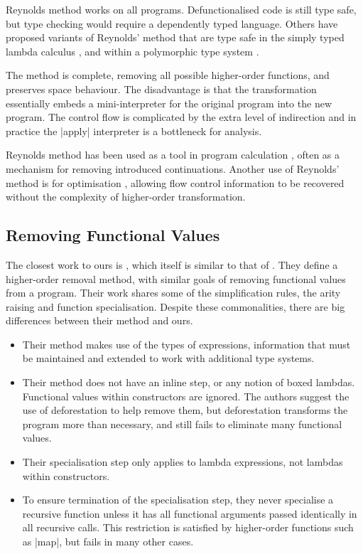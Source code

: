 Reynolds method works on all programs. Defunctionalised code is still type safe, but type checking would require a dependently typed language. Others have proposed variants of Reynolds' method that are type safe in the simply typed lambda calculus \cite{bell:type_driven_defunctionalization}, and within a polymorphic type system \cite{pottier:polymorhpic_typed_defunctionaization}.

The method is complete, removing all possible higher-order functions, and preserves space behaviour. The disadvantage is that the transformation essentially embeds a mini-interpreter for the original program into the new program. The control flow is complicated by the extra level of indirection and in practice the |apply| interpreter is a bottleneck for analysis.

Reynolds method has been used as a tool in program calculation \cite{danvy:defunctionalization_at_work,hutton:calculating_an_exceptional_machine}, often as a mechanism for removing introduced continuations. Another use of Reynolds' method is for optimisation \cite{grin,jhc}, allowing flow control information to be recovered without the complexity of higher-order transformation.

\subsection{Removing Functional Values}

The closest work to ours is \citet{chin:higher_order_removal}, which itself is similar to that of \citet{nelan:firstification}. They define a higher-order removal method, with similar goals of removing functional values from a program. Their work shares some of the simplification rules, the arity raising and function specialisation. Despite these commonalities, there are big differences between their method and ours.

\begin{itemize}
\item Their method makes use of the types of expressions, information that must be maintained and extended to work with additional type systems.
\item Their method does not have an inline step, or any notion of boxed lambdas. Functional values within constructors are ignored. The authors suggest the use of deforestation \cite{wadler:deforestation} to help remove them, but deforestation transforms the program more than necessary, and still fails to eliminate many functional values.
\item Their specialisation step only applies to lambda expressions, not lambdas within constructors.
\item To ensure termination of the specialisation step, they never specialise a recursive function unless it has all functional arguments passed identically in all recursive calls. This restriction is satisfied by higher-order functions such as |map|, but fails in many other cases.
\end{itemize}

